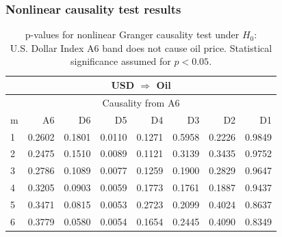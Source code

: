 \subsubsection{Nonlinear causality test results}

%
%
\begin{table}[H]
\begin{center}
\begin{tabular}{l|r r r r r r r}
\hline\hline
\multicolumn{8}{c}{USD $\Rightarrow$ Oil}\\
\hline
\multicolumn{8}{c}{Causality from A6}\\
\hline\hline
m & A6 & D6 & D5 & D4 & D3 & D2 & D1 \\
\hline
1 & 0.2602 & 0.1801 & \cellcolor{mygreen}0.0110 & 0.1271 & 0.5958 & 0.2226 & 0.9849 \\
2 & 0.2475 & 0.1510 & \cellcolor{mygreen}0.0089 & 0.1121 & 0.3139 & 0.3435 & 0.9752 \\
3 & 0.2786 & 0.1089 & \cellcolor{mygreen}0.0077 & 0.1259 & 0.1900 & 0.2829 & 0.9647 \\
4 & 0.3205 & 0.0903 & \cellcolor{mygreen}0.0059 & 0.1773 & 0.1761 & 0.1887 & 0.9437 \\
5 & 0.3471 & 0.0815 & 0.0053 & 0.2723 & 0.2099 & 0.4024 & 0.8637 \\
6 & 0.3779 & 0.0580 & 0.0054 & 0.1654 & 0.2445 & 0.4090 & 0.8349 \\
\hline\hline
\end{tabular}
\caption{p-values for nonlinear Granger causality test under $H_0$:\\
U.S. Dollar Index A6 band does not cause oil price. Statistical significance assumed for $p<0.05$.}
\end{center}
\end{table}

